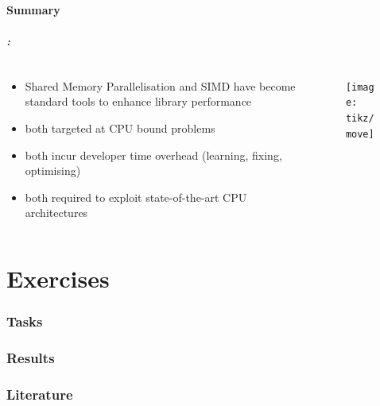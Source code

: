 \documentclass[9pt,xcolor=table]{beamer}
\begin{document}
\subsection{Summary}
\begin{frame}
\frametitle{\insertsectionhead{}: \insertsubsectionhead{}}

\begin{columns}
  \begin{column}{.62\textwidth}
    \begin{itemize}[<+->]\large
    \item Shared Memory Parallelisation and SIMD have become standard
      tools to enhance library performance
    \item both targeted at CPU bound problems
    \item both incur developer time overhead (learning, fixing,
      optimising)
    \item both required to exploit state-of-the-art CPU architectures
    \end{itemize}
  \end{column}
  \begin{column}{.35\textwidth}
    \begin{figure}[htb]
      \texttt{[image: tikz/move]}
    \end{figure}
  \end{column}

\end{columns}
\end{frame}

\part{Exercises}
\section{Tasks}
\section{Results}

\section{Literature}
\begin{frame}[c]
\frametitle{\insertsection{}}
\nocite{*}
\tiny%


\end{frame}
\end{document}
